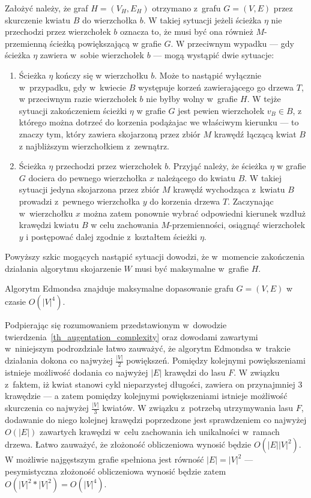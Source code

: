 {\begin{bproof}
    Założyć należy, że graf $H=(V_H, E_H)$ otrzymano z~grafu $G=(V, E)$ przez skurczenie kwiatu $B$ do wierzchołka $b$.
    W takiej sytuacji jeżeli ścieżka $\eta$ nie przechodzi przez wierzchołek $b$ oznacza to, że musi być ona również $M$-przemienną ścieżką powiększającą w grafie $G$. W przeciwnym wypadku --- gdy ścieżka $\eta$ zawiera w~sobie wierzchołek $b$ --- mogą wystąpić dwie sytuacje:
    \begin{enumerate}
      \item Ścieżka $\eta$ kończy się w wierzchołku $b$.
      Może to nastąpić wyłącznie w~przypadku, gdy w~kwiecie $B$ występuje korzeń zawierającego go drzewa $T$, w przeciwnym razie wierzchołek $b$ nie byłby wolny w~grafie $H$.
      W tejże sytuacji zakończeniem ścieżki $\eta$ w grafie $G$ jest pewien wierzchołek $v_B \in B$, z którego można dotrzeć do korzenia podążajac we właściwym kierunku --- to znaczy tym, który zawiera skojarzoną przez zbiór $M$ krawędź łączącą kwiat $B$ z najbliższym wierzchołkiem z~zewnątrz.
      \item Ścieżka $\eta$ przechodzi przez wierzchołek $b$.
      Przyjąć należy, że ścieżka $\eta$ w grafie $G$ dociera do pewnego wierzchołka $x$ należącego do kwiatu $B$.
      W takiej sytuacji jedyna skojarzona przez zbiór $M$ krawędź wychodząca z~kwiatu $B$ prowadzi z~pewnego wierzchołka $y$ do korzenia drzewa $T$.
      Zaczynając w~wierzchołku $x$ można zatem ponownie wybrać odpowiedni kierunek wzdłuż krawędzi kwiatu $B$ w celu zachowania $M$-przemienności, osiągnąć wierzchołek $y$ i postępować dalej zgodnie z~kształtem ścieżki $\eta$.
    \end{enumerate}

    Powyższy szkic mogących nastąpić sytuacji dowodzi, że w~momencie zakończenia działania algorytmu skojarzenie $W$ musi być maksymalne w~grafie $H$.
  \end{bproof}
  \begin{theorem}
    Algorytm Edmondsa znajduje maksymalne dopasowanie grafu $G=(V, E)$ w czasie $O(|V|^4)$.
  \end{theorem}
  \begin{bproof}
    Podpierając się rozumowaniem przedstawionym w~dowodzie twierdzenia~\ref{th_augentation_complexity} oraz dowodami zawartymi w~niniejszym podrozdziale łatwo zauważyć, że algorytm Edmondsa w~trakcie działania dokona co najwyżej $\frac{|V|}{2}$ powiększeń.
    Pomiędzy kolejnymi powiększeniami istnieje możliwość dodania co najwyżej $|E|$ krawędzi do lasu $F$.
    W związku z~faktem, iż kwiat stanowi cykl nieparzystej długości, zawiera on przynajmniej 3 krawędzie --- a zatem pomiędzy kolejnymi powiększeniami istnieje możliwość skurczenia co najwyżej $\frac{|V|}{3}$ kwiatów.
    W związku z~potrzebą utrzymywania lasu $F$, dodawanie do niego kolejnej krawędzi poprzedzone jest sprawdzeniem co najwyżej $O(|E|)$ zawartych krawędzi w~celu zachowania ich unikalności w~ramach drzewa.
    Łatwo zauważyć, że złożoność obliczeniowa wynosić będzie $O(|E||V|^2)$.
    W możliwie najgęstszym grafie spełniona jest równość $|E|=|V|^2$ --- pesymistyczna złożoność obliczeniowa wynosić będzie zatem $O(|V|^2*|V|^2)=O(|V|^4)$.
  \end{bproof}
}